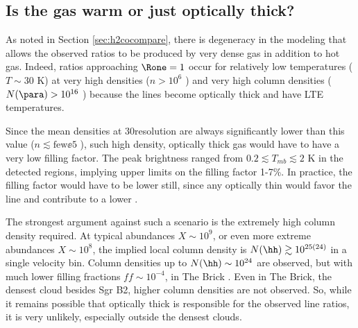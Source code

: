 \subsection{Is the gas warm or just optically thick?}
\label{sec:thickorwarm}
As noted in Section \ref{sec:h2cocompare}, there is degeneracy in the modeling
that allows the observed ratios to be produced by very dense gas in addition to
hot gas.  Indeed, ratios approaching $\Rone=1$ occur for relatively low
temperatures ($T\sim30$ K) at very high densities ($n>10^{6}$ \percc)
and very high column densities ($N(\para)>10^{16}$ \perkms \persc) because
the lines become optically thick and have LTE temperatures.

Since the mean densities at 30\arcsec resolution are always significantly lower
than this value ($n\lesssim\mathrm{few}\ee{5}$ \percc), such high density,
optically thick gas would have to have a very low filling factor.  The peak
\para \threeohthree brightness ranged from $0.2 \lesssim T_{mb} \lesssim 2$ K
in the detected regions, implying upper limits on the filling factor 1-7\%.
In practice, the filling factor would have to be lower still, since any optically
thin \para would favor the \threeohthree line and contribute to a lower \Rone.

The strongest argument against such a scenario is the extremely high column
density required.  At typical \para abundances $X\sim10^9$, or even more
extreme abundances $X\sim10^8$, the implied local column density is
$N(\hh)\gtrsim10^{25(24)}$ in a single velocity bin.  Column densities up to
$N(\hh)\sim10^{24}$ \percc are observed, but with much lower filling fractions
$ff\sim10^{-4}$, in The Brick \citep[][their Figure 4]{Rathborne2014a}.  Even
in The Brick, the densest cloud besides Sgr B2, higher column densities are not
observed.  So, while it remains possible that optically thick \para is
responsible for the observed line ratios, it is very unlikely, especially
outside the densest clouds.

